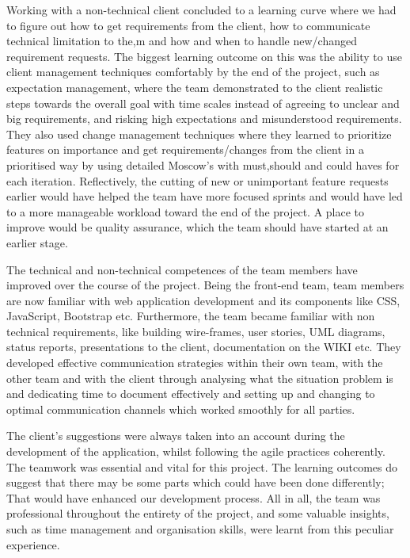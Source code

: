 \documentclass{l3proj}
\begin{document}

Working with a non-technical client concluded to a learning curve where we had to figure out how to get requirements from the client, how to communicate technical limitation to the,m and how and when to handle new/changed requirement requests. The biggest learning outcome on this was the ability to use client management techniques comfortably by the end of the project,  such as expectation management, where the team demonstrated to the client realistic steps towards the overall goal with time scales instead of agreeing to unclear and big requirements, and risking high expectations and misunderstood requirements. They also used change management techniques where they learned to prioritize features on importance and get requirements/changes from the client in a prioritised way by using detailed Moscow's with must,should and could haves for each iteration. Reflectively, the cutting of new or unimportant feature requests earlier would have helped the team have more focused sprints and would have led to a more manageable workload toward the end of the project. A place to improve would be quality assurance, which the team should have started at an earlier stage.

The technical and non-technical competences of the team members have improved over the course of the project. Being the front-end team, team members are now familiar with web application development and its components like CSS, JavaScript, Bootstrap etc. Furthermore, the team became familiar with non technical requirements, like building wire-frames, user stories, UML diagrams, status reports, presentations to the client, documentation on the WIKI etc. They developed effective communication strategies within their own team, with the other team and with the client through analysing what the situation problem is and dedicating time to document effectively and setting up and changing to optimal communication channels which worked smoothly for all parties.

The client's suggestions were always taken into an account during the development of the application, whilst following the agile practices coherently. The teamwork was essential and vital for this project. The learning outcomes do suggest that there may be some parts which could have been done differently; That would have enhanced our development process. All in all, the team was professional throughout the entirety of the project, and some valuable insights, such as time management and organisation skills, were learnt from this peculiar experience.
\end{document}
